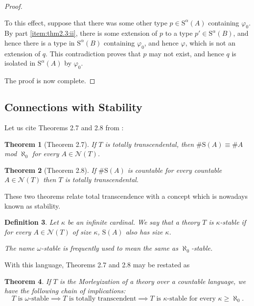 \documentclass{article}
\newtheorem{theorem}{Theorem}[section]
\newtheorem{definition}[theorem]{Definition}
\theoremstyle{nonumberplain}
\newtheorem{proof}{Proof}
\newcommand{\calN}{\mathcal{N}}
\newcommand{\Stone}{\mathrm{S}}
\newcommand{\card}[1]{\#{#1}}
\begin{document}
\begin{proof}
\begin{itemize}
To this effect, suppose that there was some other type $p \in \Stone^\alpha(A)$ containing $\varphi_0$. By part \ref{item:thm2.3:ii}, there is some extension of $p$ to a type $p' \in \Stone^\alpha(B)$, and hence there is a type in $\Stone^\alpha(B)$ containing $\varphi_0$, and hence $\varphi$, which is not an extension of $q$. This contradiction proves that $p$ may not exist, and hence $q$ is isolated in $\Stone^\alpha(A)$ by $\varphi_0$.
\end{itemize}

The proof is now complete.
\end{proof}

\subsection{Connections with Stability}

Let us cite Theorems 2.7 and 2.8 from \cite{morley}:

\begin{theorem}[Theorem 2.7]
If $T$ is totally transcendental, then $\card{\Stone(A)} \equiv \card A$ mod $\aleph_0$ for every $A \in \calN(T)$.
\end{theorem}

\begin{theorem}[Theorem 2.8]
If $\card{\Stone(A)}$ is countable for every countable $A \in \calN(T)$ then $T$ is totally transcendental.
\end{theorem}

These two theorems relate total transcendence with a concept which is nowadays known as stability.

\begin{definition}
Let $\kappa$ be an infinite cardinal. We say that a theory $T$ is \emph{$\kappa$-stable} if for every $A \in \calN(T)$ of size $\kappa$, $\Stone(A)$ also has size $\kappa$.

The name $\omega$-stable is frequently used to mean the same as $\aleph_0$-stable.
\end{definition}

With this language, Theorems 2.7 and 2.8 may be restated as

\begin{theorem}
If $T$ is the Morleyization of a theory over a countable language, we have the following chain of implications:
\begin{equation}
\text{$T$ is $\omega$-stable} \implies \text{$T$ is totally transcendent} \implies \text{$T$ is $\kappa$-stable for every $\kappa \geq \aleph_0$}.
\end{equation}
\end{theorem}
\end{document}
